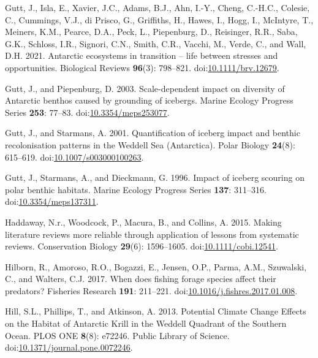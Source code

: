 \documentclass[
]{article}
\newlength{\cslhangindent}
\newenvironment{CSLReferences}[2] %
 {\begin{list}{}{%
  \setlength{\itemindent}{0pt}
  \setlength{\leftmargin}{0pt}
  \setlength{\parsep}{0pt}
  \ifodd #1
   \setlength{\leftmargin}{\cslhangindent}
   \setlength{\itemindent}{-1\cslhangindent}
  \fi
  \setlength{\itemsep}{#2\baselineskip}}}
 {\end{list}}
\begin{document}
\begin{CSLReferences}{1}{0}
Gutt, J., Isla, E., Xavier, J.C., Adams, B.J., Ahn, I.-Y., Cheng,
C.-H.C., Colesie, C., Cummings, V.J., di Prisco, G., Griffiths, H.,
Hawes, I., Hogg, I., McIntyre, T., Meiners, K.M., Pearce, D.A., Peck,
L., Piepenburg, D., Reisinger, R.R., Saba, G.K., Schloss, I.R., Signori,
C.N., Smith, C.R., Vacchi, M., Verde, C., and Wall, D.H. 2021. Antarctic
ecosystems in transition -- life between stresses and opportunities.
Biological Reviews \textbf{96}(3): 798--821.
doi:\href{https://doi.org/10.1111/brv.12679}{10.1111/brv.12679}.

Gutt, J., and Piepenburg, D. 2003. Scale-dependent impact on diversity
of {Antarctic} benthos caused by grounding of icebergs. Marine Ecology
Progress Series \textbf{253}: 77--83.
doi:\href{https://doi.org/10.3354/meps253077}{10.3354/meps253077}.

Gutt, J., and Starmans, A. 2001. Quantification of iceberg impact and
benthic recolonisation patterns in the {Weddell Sea} ({Antarctica}).
Polar Biology \textbf{24}(8): 615--619.
doi:\href{https://doi.org/10.1007/s003000100263}{10.1007/s003000100263}.

Gutt, J., Starmans, A., and Dieckmann, G. 1996. Impact of iceberg
scouring on polar benthic habitats. Marine Ecology Progress Series
\textbf{137}: 311--316.
doi:\href{https://doi.org/10.3354/meps137311}{10.3354/meps137311}.

Haddaway, N.r., Woodcock, P., Macura, B., and Collins, A. 2015. {Making
literature reviews more reliable through application of lessons from
systematic reviews}. Conservation Biology \textbf{29}(6): 1596--1605.
doi:\href{https://doi.org/10.1111/cobi.12541}{10.1111/cobi.12541}.

Hilborn, R., Amoroso, R.O., Bogazzi, E., Jensen, O.P., Parma, A.M.,
Szuwalski, C., and Walters, C.J. 2017. When does fishing forage species
affect their predators? Fisheries Research \textbf{191}: 211--221.
doi:\href{https://doi.org/10.1016/j.fishres.2017.01.008}{10.1016/j.fishres.2017.01.008}.

Hill, S.L., Phillips, T., and Atkinson, A. 2013. Potential {Climate
Change Effects} on the {Habitat} of {Antarctic Krill} in the {Weddell
Quadrant} of the {Southern Ocean}. PLOS ONE \textbf{8}(8): e72246.
Public Library of Science.
doi:\href{https://doi.org/10.1371/journal.pone.0072246}{10.1371/journal.pone.0072246}.


\end{CSLReferences}
\end{document}
